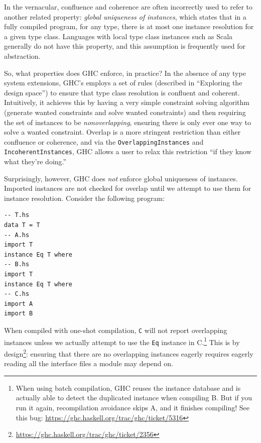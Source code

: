 \documentclass{article}
\begin{document}
In the vernacular, confluence and coherence are often incorrectly used
to refer to another related property: \emph{global uniqueness of instances},
which states that in a fully compiled program, for any type, there is at most one
instance resolution for a given type class.  Languages with local type
class instances such as Scala generally do not have this property, and
this assumption is frequently used for abstraction.

So, what properties does GHC enforce, in practice?
In the absence of any type system extensions, GHC's employs a set of
rules (described in ``Exploring the design space'') to ensure that type
class resolution is confluent and coherent.  Intuitively, it achieves
this by having a very simple constraint solving algorithm (generate
wanted constraints and solve wanted constraints) and then requiring the
set of instances to be \emph{nonoverlapping}, ensuring there is only
ever one way to solve a wanted constraint.  Overlap is a
more stringent restriction than either confluence or coherence, and
via the \verb|OverlappingInstances| and \verb|IncoherentInstances|, GHC
allows a user to relax this restriction ``if they know what they're doing.''

Surprisingly, however, GHC does \emph{not} enforce global uniqueness of
instances.  Imported instances are not checked for overlap until we
attempt to use them for instance resolution.  Consider the following program:

\begin{verbatim}
-- T.hs
data T = T
-- A.hs
import T
instance Eq T where
-- B.hs
import T
instance Eq T where
-- C.hs
import A
import B
\end{verbatim}

When compiled with one-shot compilation, \verb|C| will not report
overlapping instances unless we actually attempt to use the \verb|Eq|
instance in C.\footnote{When using batch compilation, GHC reuses the
    instance database and is actually able to detect the duplicated
    instance when compiling B.  But if you run it again, recompilation
avoidance skips A, and it finishes compiling!  See this bug:
\url{https://ghc.haskell.org/trac/ghc/ticket/5316}}  This is by
design\footnote{\url{https://ghc.haskell.org/trac/ghc/ticket/2356}}:
ensuring that there are no overlapping instances eagerly requires
eagerly reading all the interface files a module may depend on.
\end{document}
